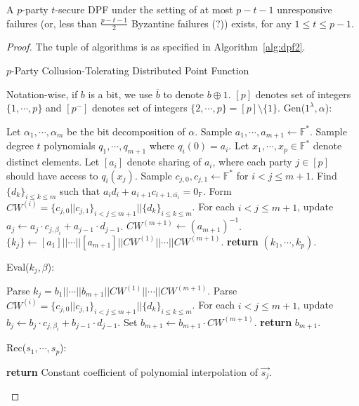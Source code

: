 \documentclass[11pt]{article}
\newcommand{\Gen}{\textsf{Gen}}
\newcommand{\Eval}{\textsf{Eval}}
\newcommand{\Rec}{\textsf{Rec}}
\begin{document}
\begin{theorem}
  A $p$-party $t$-secure DPF under the setting of at most $p-t-1$ unresponsive failures (or, less than $\frac{p-t-1}{2}$ Byzantine failures (?)) exists, for any $1 \le t \le p-1$.
\end{theorem}
\begin{proof}
  The tuple of algorithms is as specified in Algorithm~\ref{alg:dpf2}.

  \begin{algorithm}
    \caption{$p$-Party Collusion-Tolerating Distributed Point Function}\label{alg:dpf2}
    Notation-wise, if $b$ is a bit, we use $\overline{b}$ to denote $b \oplus 1$. $[p]$ denotes set of integers $\{1, \cdots, p\}$ and $[p^-]$ denotes set of integers $\{2, \cdots, p\} = [p] \setminus \{1\}$.
    \vspace{10px}
    \newline
    \Gen($1^\lambda, \alpha$):
    \begin{algorithmic}[1]
    \State Let $\alpha_1, \cdots, \alpha_m$ be the bit decomposition of $\alpha$.
    \State Sample $a_1, \cdots, a_{m+1} \leftarrow \mathbb{F}^*$.
    \State Sample degree $t$ polynomials $q_1, \cdots, q_{m+1}$ where $q_i(0) = a_i$.
    \State Let $x_1, \cdots, x_p \in \mathbb{F}^*$ denote distinct elements.
    \State Let $[a_i]$ denote sharing of $a_i$, where each party $j \in [p]$ should have access to $q_i(x_j)$.
      \State Sample $c_{j,0}, c_{j,1} \leftarrow \mathbb{F}^*$ for $i < j \le m+1$.
      \State Find $\{d_k\}_{i \le k \le m}$ such that $a_id_i + a_{i+1}c_{i+1, \overline{\alpha_i}} = 0_\mathbb{F}$.
      \State Form $CW^{(i)} = \{c_{j,0} || c_{j,1}\}_{i < j \le m+1} || \{d_k\}_{i \le k \le m}$.
      \State For each $i < j \le m+1$, update $a_j \leftarrow a_j \cdot c_{j, \beta_i} + a_{j-1} \cdot d_{j-1}$.
    \EndFor
    \State $CW^{(m+1)} \leftarrow (a_{m+1})^{-1}$.
    \State $\{k_j\} \leftarrow [a_1] || \cdots || [a_{m+1}] || CW^{(1)} || \cdots || CW^{(m+1)}$.
\State \textbf{return} $(k_1, \cdots, k_p)$.
    \end{algorithmic}
    
    \vspace{10px}
    \Eval($k_j, \beta$):
    \begin{algorithmic}[1]
    \State Parse $k_j = b_1||\cdots||b_{m+1}||CW^{(1)}||\cdots||CW^{(m+1)}$.
      \State Parse $CW^{(i)} = \{c_{j,0}||c_{j,1}\}_{i < j \le m+1} || \{d_k\}_{i \le k \le m}$.
      \State For each $i < j \le m+1$, update $b_j \leftarrow b_j \cdot c_{j,\beta_i} + b_{j-1} \cdot d_{j-1}$.
    \EndFor
    \State Set $b_{m+1} \leftarrow b_{m+1} \cdot CW^{(m+1)}$.
    \State \textbf{return} $b_{m+1}$.
    \end{algorithmic}
    
    \vspace{10px}
    \Rec($s_1, \cdots, s_p$):
    \begin{algorithmic}[1]
    \State \textbf{return} Constant coefficient of polynomial interpolation of $\overrightarrow{s_j}$.
    \end{algorithmic}
    \end{algorithm}
\end{proof}




\end{document}
